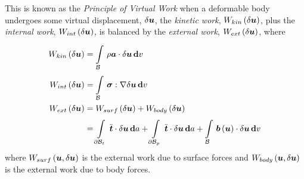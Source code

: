 This is known as the \emph{Principle of Virtual Work} \ie when a deformable
body undergoes some virtual displacement, $\delta\boldsymbol{u}$, the \emph{kinetic
  work}, $ W_{kin}\left( \delta\boldsymbol{u} \right) $, plus the \emph{internal work},
$ W_{int}\left( \delta\boldsymbol{u} \right) $, is balanced by the \emph{external work},
$ W_{ext}\left( \delta\boldsymbol{u} \right) $, where
\begin{equation}
  \begin{split}
    \fnof{W_{kin}}{\delta\vectr{u}}&=
    \gint{\embedmanifold{B}}{}{\rho\dotprod{\vectr{a}}{\delta\vectr{u}}}{v}\\
    \fnof{W_{int}}{\delta\vectr{u}}&=
    \gint{\embedmanifold{B}}{}{\doubledotprod{\tensor{\sigma}}{\gradient{}{\delta\vectr{u}}}}{v}\\
    \fnof{W_{ext}}{\delta\vectr{u}}&=\fnof{W_{surf}}{\delta\vectr{u}}+\fnof{W_{body}}{\delta\vectr{u}}\\
    &=\gint{\boundary{\embedmanifold{B}}_{t}}{}{\dotprod{\bar{\vectr{t}}}{\delta\vectr{u}}}{a}+
    \gint{\boundary{\embedmanifold{B}}_{p}}{}{\dotprod{\bar{\vectr{t}}}{\delta\vectr{u}}}{a}+
    \gint{\embedmanifold{B}}{}{\dotprod{\fnof{\vectr{b}}{\vectr{u}}}{\delta\vectr{u}}}{v}
  \end{split}
\end{equation}
where $ W_{surf}\left( \boldsymbol{u},\delta\boldsymbol{u} \right) $ is the external work due to surface
forces and $ W_{body}\left( \boldsymbol{u},\delta\boldsymbol{u} \right) $ is the external work due to
body forces. 

